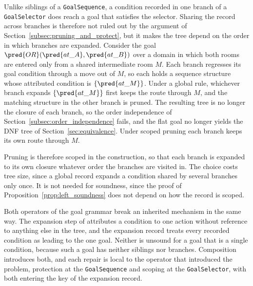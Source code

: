     Unlike siblings of a \texttt{GoalSequence}, a condition recorded in one branch of a \texttt{GoalSelector} does reach a goal that satisfies the selector.
    Sharing the record across branches is therefore not ruled out by the argument of Section~\ref{subsec:pruning_and_protect}, but it makes the tree depend on the order in which branches are expanded.
    Consider the goal $\pred{OR}(\pred{at\_A}, \pred{at\_B})$ over a domain in which both rooms are entered only from a shared intermediate room $M$.
    Each branch regresses its goal condition through a move out of $M$, so each holds a sequence structure whose attributed condition is $\{\pred{at\_M}\}$.
    Under a global rule, whichever branch expands $\{\pred{at\_M}\}$ first keeps the route through $M$, and the matching structure in the other branch is pruned.
    The resulting tree is no longer the closure of each branch, so the order independence of Section~\ref{subsec:order_independence} fails, and the flat goal no longer yields the DNF tree of Section~\ref{sec:equivalence}.
    Under scoped pruning each branch keeps its own route through $M$.
 
    Pruning is therefore scoped in the construction, so that each branch is expanded to its own closure whatever order the branches are visited in.
    The choice costs tree size, since a global record expands a condition shared by several branches only once.
    It is not needed for soundness, since the proof of Proposition~\ref{prop:left_soundness} does not depend on how the record is scoped.
 
    Both operators of the goal grammar break an inherited mechanism in the same way.
    The expansion step of \cite{cai2021} attributes a condition to one action without reference to anything else in the tree, and the expansion record treats every recorded condition as leading to the one goal.
    Neither is unsound for a goal that is a single condition, because such a goal has neither siblings nor branches.
    Composition introduces both, and each repair is local to the operator that introduced the problem, protection at the \texttt{GoalSequence} and scoping at the \texttt{GoalSelector}, with both entering the key of the expansion record.